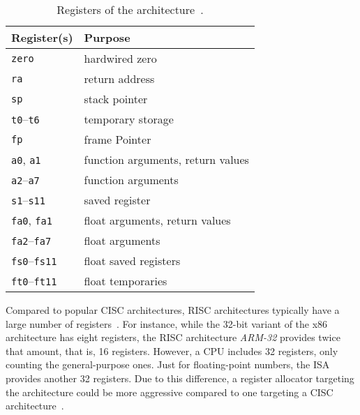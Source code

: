 \begin{wraptable}{o}{.4\textwidth}
	\centering
	\caption[Registers of the \riscv{} architecture.]{Registers of the \riscv{} architecture~\cite[p.~155]{Waterman2019}.}\label{tbl:riscv_regs}
	\begin{tabularx}{\linewidth}{l|L}
		 Register(s) & Purpose                           \\ \hline
		\texttt{zero}                  & hardwired zero                    \\ \hline
		\texttt{ra}                    & return address                    \\ \hline
		\texttt{sp}                    & stack pointer                     \\ \hline
		\texttt{t0}--\texttt{t6}       & temporary storage                 \\ \hline
		\texttt{fp}                    & frame Pointer                     \\ \hline
		\texttt{a0}, \texttt{a1}       & function arguments, return values \\ \hline
		\texttt{a2}--\texttt{a7}       & function arguments                \\ \hline
		\texttt{s1}--\texttt{s11}      & saved register                    \\ \hline
		\texttt{fa0}, \texttt{fa1}     & float arguments, return values    \\ \hline
		\texttt{fa2}--\texttt{fa7}     & float arguments                   \\ \hline
		\texttt{fs0}--\texttt{fs11}    & float saved registers             \\ \hline
		\texttt{ft0}--\texttt{ft11}    & float temporaries                 \\
	\end{tabularx}
\end{wraptable}

Compared to popular CISC architectures, RISC architectures typically have a large number of registers~\cite[Chapter~2]{Dandamudi2005}.
For instance, while the 32-bit variant of the x86 architecture has eight registers,
the RISC architecture \emph{ARM-32} provides twice that amount, that is, 16 registers.
However, a \riscv{} CPU includes 32 registers, only counting the general-purpose ones.
Just for floating-point numbers, the ISA provides another 32 registers.
Due to this difference, a register allocator targeting the \riscv{} architecture could be more aggressive compared to one targeting a CISC architecture~\cite[p.~10]{Patterson2017}.


